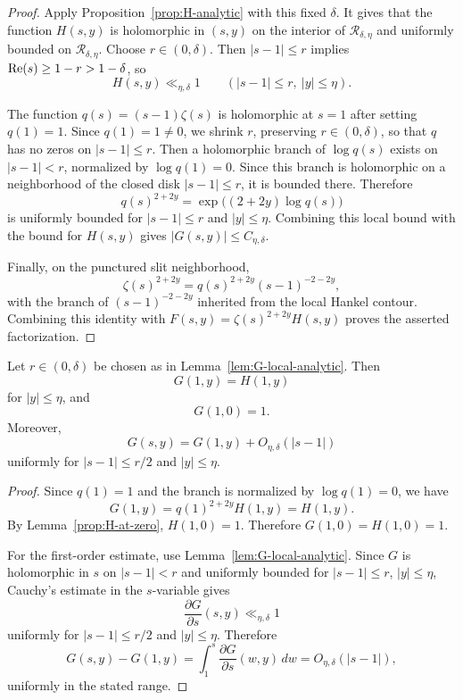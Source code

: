 \begin{proof}
Apply Proposition~\ref{prop:H-analytic} with this fixed $\delta$.
It gives that the function $H(s,y)$ is
holomorphic in $(s,y)$ on the interior of
$\mathcal R_{\delta,\eta}$ and uniformly bounded on
$\mathcal R_{\delta,\eta}$. Choose $r\in(0,\delta)$. Then
$|s-1|\leq r$ implies $\operatorname{Re}(s)\geq1-r>1-\delta$, so
\[
    H(s,y)\ll_{\eta,\delta}1
    \qquad (|s-1|\leq r,\ |y|\leq\eta).
\]

The function $q(s)=(s-1)\zeta(s)$ is holomorphic at $s=1$ after
setting $q(1)=1$. Since $q(1)=1\neq0$, we shrink $r$, preserving
$r\in(0,\delta)$, so that $q$ has no zeros on $|s-1|\leq r$.
Then a holomorphic branch of $\log q(s)$ exists on $|s-1|<r$,
normalized by $\log q(1)=0$. Since this branch is holomorphic on
a neighborhood of the closed disk $|s-1|\leq r$, it is bounded
there. Therefore
\[
    q(s)^{2+2y}
    =\exp\bigl((2+2y)\log q(s)\bigr)
\]
is uniformly bounded for $|s-1|\leq r$ and $|y|\leq\eta$.
Combining this local bound with the bound for $H(s,y)$ gives
$|G(s,y)|\leq C_{\eta,\delta}$.

Finally, on the punctured slit neighborhood,
\[
    \zeta(s)^{2+2y}
    =q(s)^{2+2y}(s-1)^{-2-2y},
\]
with the branch of $(s-1)^{-2-2y}$ inherited from the local
Hankel contour. Combining this identity with
$F(s,y)=\zeta(s)^{2+2y}H(s,y)$ proves the asserted factorization.
\end{proof}

\begin{lemma}
\label{lem:G-local-values}
Let $r\in(0,\delta)$ be chosen as in Lemma~\ref{lem:G-local-analytic}.
Then
\[
    G(1,y)=H(1,y)
\]
for $|y|\leq\eta$, and
\[
    G(1,0)=1.
\]
Moreover,
\[
    G(s,y)=G(1,y)+O_{\eta,\delta}(|s-1|)
\]
uniformly for $|s-1|\leq r/2$ and $|y|\leq\eta$.
\end{lemma}

\begin{proof}
Since $q(1)=1$ and the branch is normalized by $\log q(1)=0$, we
have
\[
    G(1,y)=q(1)^{2+2y}H(1,y)=H(1,y).
\]
By Lemma~\ref{prop:H-at-zero}, $H(1,0)=1$. Therefore
$G(1,0)=H(1,0)=1$.

For the first-order estimate, use Lemma~\ref{lem:G-local-analytic}.
Since $G$ is holomorphic in $s$ on $|s-1|<r$ and uniformly bounded
for $|s-1|\leq r$, $|y|\leq\eta$, Cauchy's estimate in the
$s$-variable gives
\[
    \frac{\partial G}{\partial s}(s,y)\ll_{\eta,\delta} 1
\]
uniformly for $|s-1|\leq r/2$ and $|y|\leq\eta$. Therefore
\[
    G(s,y)-G(1,y)
    =\int_1^s \frac{\partial G}{\partial s}(w,y)\,dw
    =O_{\eta,\delta}(|s-1|),
\]
uniformly in the stated range.
\end{proof}

